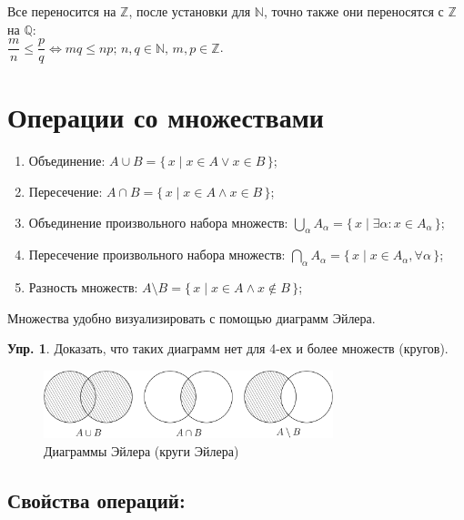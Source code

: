 \documentclass[12pt]{article}
\theoremstyle{definition}
\newtheorem{exrc}{Упр.}
\begin{document}
Все переносится на $\mathbb{Z}$, после установки для $\mathbb{N}$, точно также они переносятся с $\mathbb{Z}$ на $\mathbb{Q}$:\\
 $\dfrac{m}{n} \leq \dfrac{p}{q} \Leftrightarrow mq \leq np;\, n, q \in \mathbb{N}, \, m, p \in \mathbb{Z}$.

\section*{Операции со множествами}

\begin{enumerate}[label={(\arabic*)}]
	\item Объединение: $A \cup B = \{\, x \mid x \in A \vee x \in B \,\}$;
	\item Пересечение: $A \cap B = \{\, x \mid x \in A \wedge x \in B \,\}$;
	\item Объединение произвольного набора множеств: $\bigcup\limits_\alpha A_\alpha = \{\, x \mid \exists \alpha \colon x \in A_\alpha \,\}$;
	\item Пересечение произвольного набора множеств: $\bigcap\limits_\alpha A_\alpha = \{\, x \mid x \in A_\alpha, \forall \alpha \,\}$;
	\item Разность множеств: $A \setminus B = \{\, x \mid x \in A \wedge x \notin B \,\}$;
\end{enumerate}

Множества удобно визуализировать с помощью диаграмм Эйлера.
\begin{exrc}
	Доказать, что таких диаграмм нет для 4-ех и более множеств (кругов).
\end{exrc}
\begin{figure}[H]
	\centering
	\includegraphics[width = 0.75\textwidth]{3_3.png}
	\caption{Диаграммы Эйлера (круги Эйлера)}
	\label{3_3}
\end{figure}

\subsection*{Свойства операций:}
\end{document}

